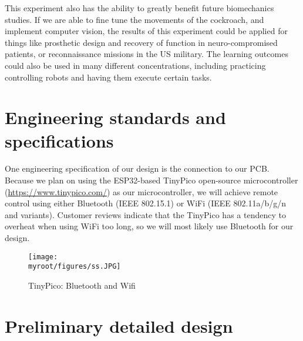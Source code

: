 \documentclass[twocolumn,10pt]{IEEEtran}
\newcommand{\myroot}{.}
\begin{document}
This experiment also has the ability to greatly benefit future  biomechanics studies. If we are able to fine tune the movements of the cockroach, and implement computer vision, the results of this experiment could be applied for things like prosthetic design and recovery of function in neuro-compromised patients, or reconnaissance missions in the US military. The learning outcomes could also be used in many different concentrations, including practicing controlling robots and having them execute certain tasks. 

\section{Engineering standards and specifications}
One engineering specification of our design is the connection to our PCB. Because we plan on using the ESP32-based TinyPico open-source microcontroller (\url{https://www.tinypico.com/}) as our microcontroller, we will achieve remote control using either Bluetooth (IEEE 802.15.1) or WiFi (IEEE 802.11a/b/g/n and variants). Customer reviews indicate that the TinyPico has a tendency to overheat when using WiFi too long, so we will most likely use Bluetooth for our design.
\begin{figure}[ht!]
\centering
\texttt{[image: \\myroot/figures/ss.JPG]}
\caption{TinyPico: Bluetooth and Wifi}
\label{fig:ss}
\end{figure}




\section{Preliminary detailed design}
\end{document}
